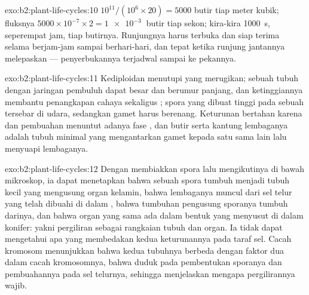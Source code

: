 \begin{solution}{exo:b2:plant-life-cycles:10}
$10^{11}/(10^{6}\times 20) = \num{5000}$ butir tiap meter kubik;
fluksnya $5000\times 10^{-7}\times 2 = \qty{1e-3}{}$ butir tiap sekon;
kira-kira \qty{1000}{s}, seperempat jam, tiap butirnya. Runjungnya
harus terbuka dan siap terima selama berjam-jam sampai berhari-hari,
dan tepat ketika runjung jantannya melepaskan  ---
penyerbukannya terjadwal sampai ke pekannya.
\end{solution}

\begin{solution}{exo:b2:plant-life-cycles:11}
Kediploidan menutupi   yang merugikan; sebuah tubuh
 dengan jaringan pembuluh dapat besar dan berumur panjang, dan
ketinggiannya membantu penangkapan cahaya sekaligus ;
spora yang dibuat tinggi pada sebuah  tersebar di udara,
sedangkan gamet harus berenang. Keturunan  bertahan karena
 dan pembuahan menuntut adanya fase , dan butir  serta kantung lembaganya adalah tubuh minimal yang mengantarkan
gamet kepada satu sama lain lalu menyuapi lembaganya.
\end{solution}

\begin{solution}{exo:b2:plant-life-cycles:12}
Dengan membiakkan spora lalu mengikutinya di bawah mikroskop, ia dapat
menetapkan bahwa sebuah spora tumbuh menjadi tubuh kecil yang
mengusung organ kelamin, bahwa lembaganya muncul dari sel telur yang
telah dibuahi di dalam , bahwa tumbuhan pengusung sporanya
tumbuh darinya, dan bahwa organ yang sama ada dalam bentuk yang
menyusut di dalam  konifer: yakni pergiliran sebagai
rangkaian tubuh dan organ. Ia tidak dapat mengetahui apa yang
membedakan kedua keturunannya pada taraf sel. Cacah kromosom
menunjukkan bahwa kedua tubuhnya berbeda dengan faktor dua dalam cacah
kromosomnya, bahwa  duduk pada pembentukan sporanya dan
pembuahannya pada sel telurnya, sehingga menjelaskan mengapa
pergilirannya wajib.
\end{solution}

